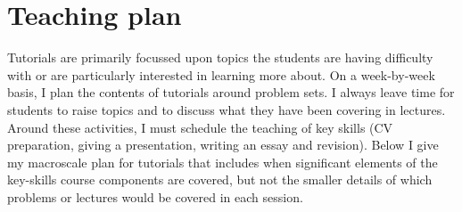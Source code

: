 \chapter{Teaching plan}\label{ap:plan}

Tutorials are primarily focussed upon topics the students are having difficulty with or are particularly interested in learning more about. On a week-by-week basis, I plan the contents of tutorials around problem sets. I always leave time for students to raise topics and to discuss what they have been covering in lectures. Around these activities, I must schedule the teaching of key skills (CV preparation, giving a presentation, writing an essay and revision). Below I give my macroscale plan for tutorials that includes when significant elements of the key-skills course components are covered, but not the smaller details of which problems or lectures would be covered in each session.

